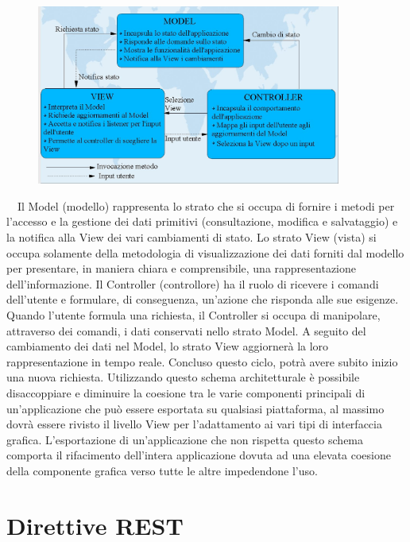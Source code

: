 \begin{figure}[htbp]
\begin{center}
\includegraphics[width=10cm]{contents/images/mvc}
\end{center}
\caption{}
\label{fig:mvc}
\end{figure}
  
Il Model (modello) rappresenta lo strato che si occupa di fornire i metodi per l’accesso e la gestione dei dati primitivi (consultazione, modifica e salvataggio)  e la notifica alla View dei vari cambiamenti di stato.
Lo strato View (vista) si occupa solamente della metodologia di visualizzazione dei dati forniti dal modello per presentare, in maniera chiara e comprensibile, una rappresentazione dell’informazione.
Il Controller (controllore) ha il ruolo di ricevere i comandi dell’utente e formulare, di conseguenza, un’azione che risponda alle sue esigenze.
Quando l’utente formula una richiesta, il Controller si occupa di manipolare, attraverso dei comandi, i dati conservati nello strato Model. A seguito del cambiamento dei dati nel Model, lo strato View aggiornerà la loro rappresentazione in tempo reale. Concluso questo ciclo, potrà avere subito inizio una nuova richiesta. 
Utilizzando questo schema architetturale è possibile disaccoppiare e diminuire la coesione tra le varie componenti principali di un’applicazione che può essere esportata su qualsiasi piattaforma, al massimo dovrà essere rivisto il livello View per l’adattamento ai vari tipi di interfaccia grafica. 
L’esportazione di un’applicazione che non rispetta questo schema comporta il rifacimento dell’intera applicazione dovuta ad una elevata coesione della componente grafica verso tutte le altre impedendone l’uso. 

\section{Direttive REST} %
\label{sec:direttive_rest}

